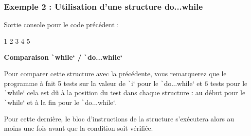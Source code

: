 \documentclass[10pt]{article}
\begin{document}
\subsubsection{Exemple 2 : Utilisation d'une structure do...while}


\bigskip
Sortie console pour le code précédent :

\begin{textcode}
    1 2 3 4 5
\end{textcode}


\begin{noteblock}
    \textbf{Comparaison \texttt`while` / \texttt`do...while`}
    
    \smallskip 
    Pour comparer cette structure avec la précédente, vous remarquerez que le programme à fait 5 tests sur la valeur de \texttt`i` pour le \texttt`do...while` et 6 tests pour le \texttt`while` cela est dû à la position du test dans chaque structure : au début pour le \texttt`while` et à la fin pour le \texttt`do...while`.
    
    \smallskip
    Pour cette dernière, le bloc d'instructions de la structure s'exécutera alors au moins une fois avant que la condition soit vérifiée.
\end{noteblock}
\end{document}
